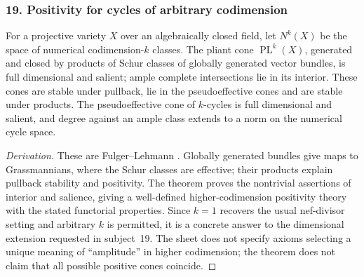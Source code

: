 \subsubsection{19. Positivity for cycles of arbitrary codimension}
\begin{theorem}\label{B:subject19}
For a projective variety $X$ over an algebraically closed field, let $N^k(X)$ be the space of numerical codimension-$k$ classes. The pliant cone $\operatorname{PL}^k(X)$, generated and closed by products of Schur classes of globally generated vector bundles, is full dimensional and salient; ample complete intersections lie in its interior. These cones are stable under pullback, lie in the pseudoeffective cones and are stable under products. The pseudoeffective cone of $k$-cycles is full dimensional and salient, and degree against an ample class extends to a norm on the numerical cycle space.
\end{theorem}
\begin{proof}[Derivation]
These are Fulger--Lehmann \cite[Theorems 1.3 and 1.4]{BFulgerLehmann2017}. Globally generated bundles give maps to Grassmannians, where the Schur classes are effective; their products explain pullback stability and positivity. The theorem proves the nontrivial assertions of interior and salience, giving a well-defined higher-codimension positivity theory with the stated functorial properties. Since $k=1$ recovers the usual nef-divisor setting and arbitrary $k$ is permitted, it is a concrete answer to the dimensional extension requested in subject~19. The sheet does not specify axioms selecting a unique meaning of ``amplitude'' in higher codimension; the theorem does not claim that all possible positive cones coincide.
\end{proof}

